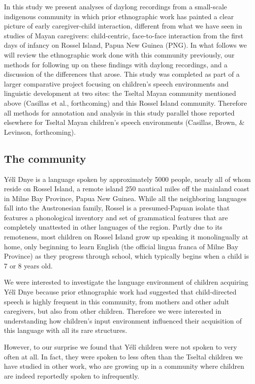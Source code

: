\documentclass[,man,floatsintext]{apa6}
\begin{document}
In this study we present analyses of daylong recordings from a
small-scale indigenous community in which prior ethnographic work has
painted a clear picture of early caregiver-child interaction, different
from what we have seen in studies of Mayan caregivers: child-centric,
face-to-face interaction from the first days of infancy on Rossel
Island, Papua New Guinea (PNG). In what follows we will review the
ethnographic work done with this community previously, our methods for
following up on these findings with daylong recordings, and a discussion
of the differences that arose. This study was completed as part of a
larger comparative project focusing on children's speech environments
and linguistic development at two sites: the Tseltal Mayan community
mentioned above (Casillas et al., forthcoming) and this Rossel Island
community. Therefore all methods for annotation and analysis in this
study parallel those reported elsewhere for Tseltal Mayan children's
speech environments (Casillas, Brown, \& Levinson, forthcoming).

\subsection{The community}\label{the-community}

Yélî Dnye is a language spoken by approximately 5000 people, nearly all
of whom reside on Rossel Island, a remote island 250 nautical miles off
the mainland coast in Milne Bay Province, Papua New Guinea. While all
the neighboring languages fall into the Austronesian family, Rossel is a
presumed-Papuan isolate that features a phonological inventory and set
of grammatical features that are completely unattested in other
languages of the region. Partly due to its remoteness, most children on
Rossel Island grow up speaking it monolingually at home, only beginning
to learn English (the official lingua franca of Milne Bay Province) as
they progress through school, which typically begins when a child is 7
or 8 years old.

We were interested to investigate the language environment of children
acquiring Yélî Dnye because prior ethnographic work had suggested that
child-directed speech is highly frequent in this community, from mothers
and other adult caregivers, but also from other children. Therefore we
were interested in understanding how children's input environment
influenced their acquisition of this language with all its rare
structures.

However, to our surprise we found that Yélî children were not spoken to
very often at all. In fact, they were spoken to less often than the
Tseltal children we have studied in other work, who are growing up in a
community where children are indeed reportedly spoken to infrequently.
\end{document}
